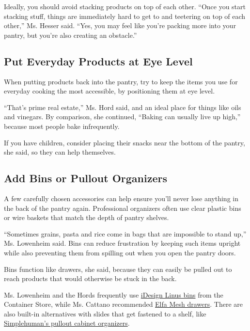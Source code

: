 Ideally, you should avoid stacking products on top of each other. ``Once
you start stacking stuff, things are immediately hard to get to and
teetering on top of each other,'' Ms. Hesser said. ``Yes, you may feel
like you're packing more into your pantry, but you're also creating an
obstacle.''

\hypertarget{put-everyday-products-at-eye-level}{%
\subsection{Put Everyday Products at Eye
Level}\label{put-everyday-products-at-eye-level}}

When putting products back into the pantry, try to keep the items you
use for everyday cooking the most accessible, by positioning them at eye
level.

``That's prime real estate,'' Ms. Hord said, and an ideal place for
things like oils and vinegars. By comparison, she continued, ``Baking
can usually live up high,'' because most people bake infrequently.

If you have children, consider placing their snacks near the bottom of
the pantry, she said, so they can help themselves.

\hypertarget{add-bins-or-pullout-organizers}{%
\subsection{Add Bins or Pullout
Organizers}\label{add-bins-or-pullout-organizers}}

A few carefully chosen accessories can help ensure you'll never lose
anything in the back of the pantry again. Professional organizers often
use clear plastic bins or wire baskets that match the depth of pantry
shelves.

``Sometimes grains, pasta and rice come in bags that are impossible to
stand up,'' Ms. Lowenheim said. Bins can reduce frustration by keeping
such items upright while also preventing them from spilling out when you
open the pantry doors.

Bins function like drawers, she said, because they can easily be pulled
out to reach products that would otherwise be stuck in the back.

Ms. Lowenheim and the Hords frequently use
\href{https://www.containerstore.com/s?source=form\&refinements=\&q=linus+bins\&submit=}{iDesign
Linus bins} from the Container Store, while Ms. Cattano recommended
\href{https://www.containerstore.com/s/white-elfa-mesh-drawers/d?productId=10014211\&q=elfa\%20mesh}{Elfa
Mesh drawers}. There are also built-in alternatives with slides that get
fastened to a shelf, like
\href{https://www.simplehuman.com/kitchen-pull-out-cabinet-organizer}{Simplehuman's
pullout cabinet organizers}.

